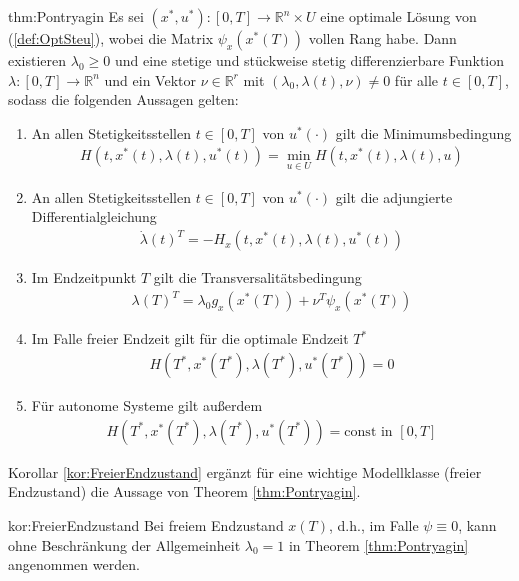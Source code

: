 \begin{theo}{thm:Pontryagin}
Es sei $(x^*,u^*): [0,T]  \rightarrow \mathbb{R}^n  \times U$ eine optimale Lösung von (\ref{def:OptSteu}), wobei die Matrix $\psi_x(x^*(T))$ vollen Rang habe. 
Dann existieren $\lambda_0 \geq 0$ und eine stetige und stückweise stetig differenzierbare Funktion $\lambda: [0,T] \rightarrow \mathbb{R}^n$ und ein Vektor $\nu \in \mathbb{R}^r$ mit $(\lambda_0, \lambda(t), \nu) \neq 0$ für alle $t \in [0,T]$, sodass die folgenden Aussagen gelten:
\begin{enumerate}
	\renewcommand{\labelenumi}{(\roman{enumi})}
	\item An allen Stetigkeitsstellen $t \in [0,T]$ von $u^*(\cdot)$ gilt die Minimumsbedingung
		\begin{align}
			H(t,x^*(t),\lambda(t),u^*(t)) = \min_{u \in U} 	H(t,x^*(t),\lambda(t),u) 
			\label{eqn:Minimumsbedingung}
		\end{align}
	\item An allen Stetigkeitsstellen $t \in [0,T]$ von $u^*(\cdot)$ gilt die adjungierte Differentialgleichung
		\begin{align}
			\dot{\lambda}(t)^T = -H_x(t,x^*(t),\lambda(t),u^*(t))
		\end{align}
	\item Im Endzeitpunkt $T$ gilt die Transversalitätsbedingung
		\begin{align}
			\lambda(T)^T = \lambda_0g_x(x^*(T))+\nu^T\psi_x(x^*(T))
		\end{align}
	\item Im Falle freier Endzeit gilt für die optimale Endzeit $T^*$
		\begin{align}
			H(T^*,x^*(T^*),\lambda(T^*),u^*(T^*)) = 0 
		\end{align}
	\item Für autonome Systeme gilt außerdem
		\begin{align}
			H(T^*,x^*(T^*),\lambda(T^*),u^*(T^*)) = \text{const in } [0,T]
		\end{align}
\end{enumerate}
\end{theo}
\pagebreak

Korollar \ref{kor:FreierEndzustand} ergänzt für eine wichtige Modellklasse (freier Endzustand) die Aussage von Theorem \ref{thm:Pontryagin}.
\begin{korollar}[]{kor:FreierEndzustand}
	Bei freiem Endzustand $x(T)$, d.h., im Falle $\psi \equiv 0$, kann ohne Beschränkung der Allgemeinheit $\lambda_0 = 1$ in Theorem \ref{thm:Pontryagin} angenommen werden.
\end{korollar}

